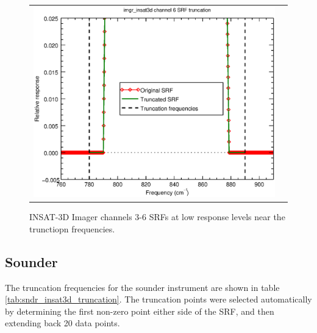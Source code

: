 \begin{figure}[H]
\begin{tabular}{c c}
    \includegraphics[scale=0.35]{graphics/imgr/trunc/imgr_insat3d-6.trunc.eps}
  \end{tabular}
  \caption{INSAT-3D Imager channels 3-6 SRFs at low response levels near the trunctiopn frequencies.}
  \label{fig:imgr_ch3-6_trunc}
\end{figure}


\subsection{Sounder}
The truncation frequencies for the sounder instrument are shown in table \ref{tab:sndr_insat3d_truncation}. The truncation points were selected automatically by determining the first non-zero point either side of the SRF, and then extending back 20 data points.

